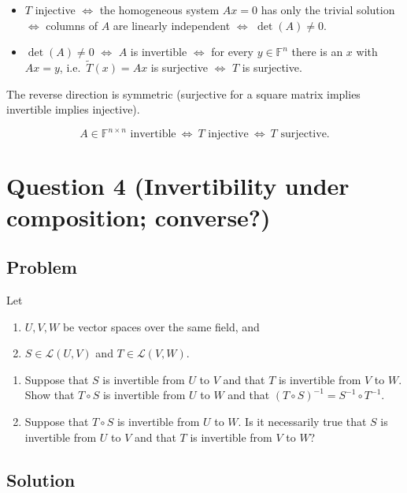 \documentclass[12pt]{article}
\newcommand{\F}{\mathbb{F}}
\newcommand{\cL}{\mathcal{L}}
\begin{document}
\begin{itemize}[leftmargin=*]
\item $T$ injective $\Longleftrightarrow$ the homogeneous system $Ax=0$ has only the trivial solution
$\Longleftrightarrow$ columns of $A$ are linearly independent $\Longleftrightarrow$ $\det(A)\neq 0$.
\item $\det(A)\neq 0$ $\Longleftrightarrow$ $A$ is invertible $\Longleftrightarrow$ for every $y\in\F^n$ there is an $x$ with $Ax=y$,
i.e.\ $\widetilde{T}(x)=Ax$ is surjective $\Longleftrightarrow$ $T$ is surjective.
\end{itemize}
The reverse direction is symmetric (surjective for a square matrix implies invertible implies injective).

\[
\boxed{\,A\in\F^{n\times n}\text{ invertible}\ \Longleftrightarrow\ T\text{ injective}\ \Longleftrightarrow\ T\text{ surjective.}\,}
\]

\newpage
\section{Question 4 (Invertibility under composition; converse?)}
\subsection{Problem}
Let
\begin{enumerate}[label=(\roman*)]
\item $U,V,W$ be vector spaces over the same field, and
\item $S\in\cL(U,V)$ and $T\in\cL(V,W)$.
\end{enumerate}
\begin{enumerate}[label=(\alph*)]
\item Suppose that $S$ is invertible from $U$ to $V$ and that $T$ is invertible from $V$ to $W$.
Show that $T\circ S$ is invertible from $U$ to $W$ and that $(T\circ S)^{-1}=S^{-1}\circ T^{-1}$.
\item Suppose that $T\circ S$ is invertible from $U$ to $W$.
Is it necessarily true that $S$ is invertible from $U$ to $V$ and that $T$ is invertible from $V$ to $W$?
\end{enumerate}

\subsection{Solution}
\end{document}

